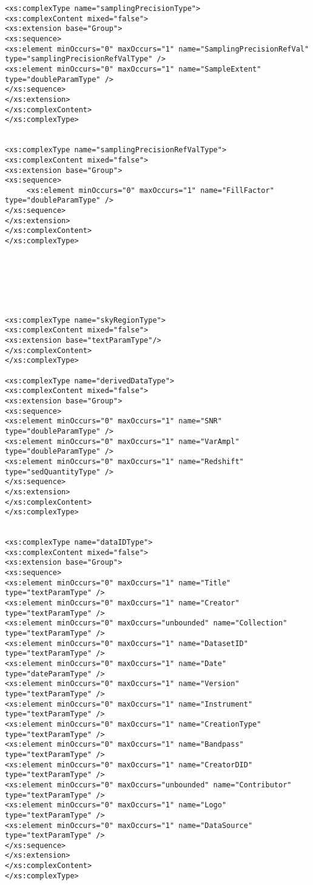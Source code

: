 {\begin{flushleft}
\begin{fmppage}
\begin{verbatim}
<xs:complexType name="samplingPrecisionType">
<xs:complexContent mixed="false">
<xs:extension base="Group">
<xs:sequence>
<xs:element minOccurs="0" maxOccurs="1" name="SamplingPrecisionRefVal" type="samplingPrecisionRefValType" />
<xs:element minOccurs="0" maxOccurs="1" name="SampleExtent" type="doubleParamType" />
</xs:sequence>
</xs:extension>
</xs:complexContent>
</xs:complexType>


<xs:complexType name="samplingPrecisionRefValType">
<xs:complexContent mixed="false">
<xs:extension base="Group">
<xs:sequence>
     <xs:element minOccurs="0" maxOccurs="1" name="FillFactor" type="doubleParamType" />
</xs:sequence>
</xs:extension>
</xs:complexContent>
</xs:complexType>




\end{verbatim}
\end{fmppage}

\begin{fmppage}
\begin{verbatim}



<xs:complexType name="skyRegionType">
<xs:complexContent mixed="false">
<xs:extension base="textParamType"/>
</xs:complexContent>
</xs:complexType>

<xs:complexType name="derivedDataType">
<xs:complexContent mixed="false">
<xs:extension base="Group">
<xs:sequence>
<xs:element minOccurs="0" maxOccurs="1" name="SNR" type="doubleParamType" />
<xs:element minOccurs="0" maxOccurs="1" name="VarAmpl" type="doubleParamType" />
<xs:element minOccurs="0" maxOccurs="1" name="Redshift" type="sedQuantityType" />
</xs:sequence>
</xs:extension>
</xs:complexContent>
</xs:complexType>


<xs:complexType name="dataIDType">
<xs:complexContent mixed="false">
<xs:extension base="Group">
<xs:sequence>
<xs:element minOccurs="0" maxOccurs="1" name="Title" type="textParamType" />
<xs:element minOccurs="0" maxOccurs="1" name="Creator" type="textParamType" />
<xs:element minOccurs="0" maxOccurs="unbounded" name="Collection" type="textParamType" />
<xs:element minOccurs="0" maxOccurs="1" name="DatasetID" type="textParamType" />
<xs:element minOccurs="0" maxOccurs="1" name="Date" type="dateParamType" />
<xs:element minOccurs="0" maxOccurs="1" name="Version" type="textParamType" />
<xs:element minOccurs="0" maxOccurs="1" name="Instrument" type="textParamType" />
<xs:element minOccurs="0" maxOccurs="1" name="CreationType" type="textParamType" />
<xs:element minOccurs="0" maxOccurs="1" name="Bandpass" type="textParamType" />
<xs:element minOccurs="0" maxOccurs="1" name="CreatorDID" type="textParamType" />
<xs:element minOccurs="0" maxOccurs="unbounded" name="Contributor" type="textParamType" />
<xs:element minOccurs="0" maxOccurs="1" name="Logo" type="textParamType" />
<xs:element minOccurs="0" maxOccurs="1" name="DataSource" type="textParamType" />
</xs:sequence>
</xs:extension>
</xs:complexContent>
</xs:complexType>





\end{verbatim}
\end{fmppage}
\end{flushleft}}
